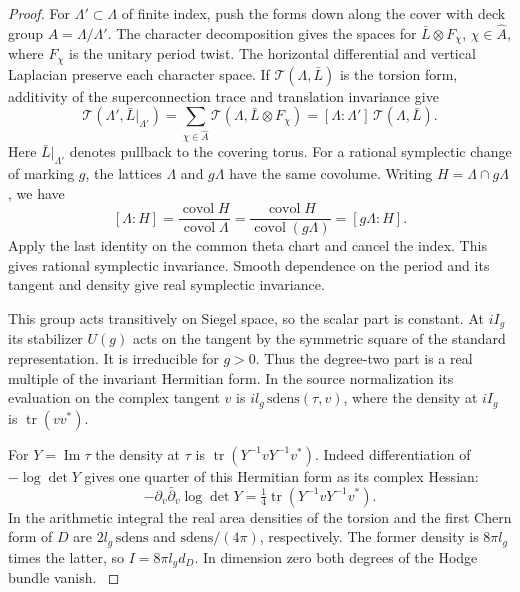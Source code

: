 \begin{proof}
For \(\Lambda'\subset\Lambda\) of finite index, push the forms
down along the cover with deck group \(A=\Lambda/\Lambda'\).
The character decomposition gives the spaces for
\(\bar L\otimes F_\chi\), \(\chi\in\widehat A\), where \(F_\chi\)
is the unitary period twist. The horizontal differential and
vertical Laplacian preserve each character space. If
\(\mathcal T(\Lambda,\bar L)\) is the torsion form, additivity
of the superconnection trace and translation invariance give
\[
 \mathcal T(\Lambda',\bar L|_{\Lambda'})
   =\sum_{\chi\in\widehat A}\mathcal T(\Lambda,\bar L\otimes F_\chi)
   =[\Lambda:\Lambda']\,\mathcal T(\Lambda,\bar L).
\]
Here \(\bar L|_{\Lambda'}\) denotes pullback to the covering torus.
For a rational symplectic change of marking \(g\), the lattices
\(\Lambda\) and \(g\Lambda\) have the same covolume. Writing \(H=\Lambda\cap g\Lambda\), we have
\[
 [\Lambda:H]=\frac{\operatorname{covol}H}{\operatorname{covol}\Lambda}
 =\frac{\operatorname{covol}H}{\operatorname{covol}(g\Lambda)}
 =[g\Lambda:H].
\] Apply the last identity on the common
theta chart and cancel the index. This gives rational symplectic
invariance. Smooth dependence on the period and its tangent and
density give real symplectic invariance.
\label{cor:hodge-surface-degree-3}


This group acts transitively on Siegel space, so the scalar
part is constant. At \(iI_g\) its stabilizer \(U(g)\) acts on
the tangent by the symmetric square of the standard representation.
It is irreducible for \(g>0\). Thus the degree-two part is a
real multiple of the invariant Hermitian form. In the source
normalization its evaluation on the complex tangent \(v\) is
\(i l_g\,\mathrm{sdens}(\tau,v)\), where the density at
\(iI_g\) is \(\operatorname{tr}(v v^*)\).

For \(Y=\operatorname{Im}\tau\) the density at \(\tau\) is
\(\operatorname{tr}(Y^{-1}vY^{-1}v^*)\). Indeed differentiation
of \(-\log\det Y\) gives one quarter of this Hermitian form
as its complex Hessian:
\[
 -\partial_v\bar\partial_v\log\det Y
      =\tfrac14\operatorname{tr}(Y^{-1}vY^{-1}v^*).
\]
In the arithmetic integral the real area densities of the torsion
and the first Chern form of \(D\) are \(2l_g\,\mathrm{sdens}\)
and \(\mathrm{sdens}/(4\pi)\), respectively. The former density
is \(8\pi l_g\) times the latter, so \(I=8\pi l_gd_D\).
In dimension zero both degrees of the Hodge bundle vanish.
\label{cor:hodge-surface-degree-4}


\end{proof}
